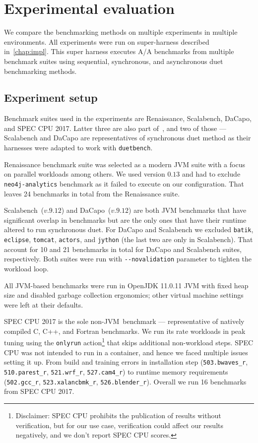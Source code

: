 \chapter{Experimental evaluation}
\label{chap:evaluation}

We compare the benchmarking methods on multiple experiments in multiple environments.
All experiments were run on super-harness described in~\cref{chap:impl}.
This super harness executes A/A benchmarks from multiple benchmark suites using sequential, synchronous, and asynchronous duet benchmarking methods.

\section{Experiment setup}
\label{sec:experiment_setup}

Benchmark suites used in the experiments are Renaissance, Scalabench, DaCapo, and SPEC CPU 2017.
Latter three are also part of~\citet{bulej2020duet}, and two of those --- Scalabench and DaCapo are representatives of synchronous duet method as their harnesses were adapted to work with \lstinline{duetbench}.

Renaissance benchmark suite was selected as a modern JVM suite with a focus on parallel workloads among others\cite{prokopec2019renaissance}.
We used version $0.13$ and had to exclude \lstinline{neo4j-analytics} benchmark as it failed to execute on our configuration.
That leaves 24 benchmarks in total from the Renaissance suite.

Scalabench~($v.9.12$) and DaCapo~($v.9.12$) are both JVM benchmarks that have significant overlap in benchmarks but are the only ones that have their runtime altered to run synchronous duet.
For DaCapo and Scalabench we excluded \lstinline{batik}, \lstinline{eclipse}, \lstinline{tomcat}, \lstinline{actors}, and \lstinline{jython} (the last two are only in Scalabench).
That account for 10 and 21 benchmarks in total for DaCapo and Scalabench suites, respectively.
Both suites were run with \lstinline{--novalidation} parameter to tighten the workload loop.

All \mbox{JVM-based} benchmarks were run in OpenJDK 11.0.11 JVM with fixed heap size and disabled garbage collection ergonomics; other virtual machine settings were left at their defaults.

SPEC CPU 2017 is the sole \mbox{non-JVM benchmark} --- representative of natively compiled C, C++, and Fortran benchmarks.
We run its rate workloads in peak tuning using the \lstinline{onlyrun} action\footnote{
	Disclaimer: SPEC CPU prohibits the publication of results without verification, but for our use case, verification could affect our results negatively, and we don't report SPEC CPU scores.}
that skips additional non-workload steps.
SPEC CPU was not intended to run in a container, and hence we faced multiple issues setting it up.
From build and training errors in installation step (\lstinline{503.bwaves_r}, \lstinline{510.parest_r}, \lstinline{521.wrf_r}, \lstinline{527.cam4_r}) to runtime memory requirements (\lstinline{502.gcc_r}, \lstinline{523.xalancbmk_r}, \lstinline{526.blender_r}).
Overall we run 16 benchmarks from SPEC CPU 2017.

